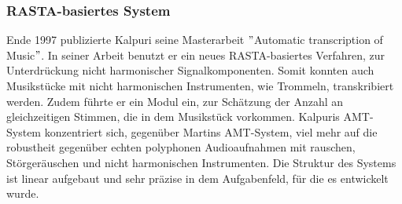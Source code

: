 \subsubsection{RASTA-basiertes System}
Ende 1997 publizierte Kalpuri seine Masterarbeit \("\)Automatic transcription of Music\("\).
\cite{klapuri1998automatic}
In seiner Arbeit benutzt er ein neues RASTA-basiertes Verfahren, zur Unterdrückung nicht harmonischer Signalkomponenten.
Somit konnten auch Musikstücke mit nicht harmonischen Instrumenten, wie Trommeln, transkribiert werden.
Zudem führte er ein Modul ein, zur Schätzung der Anzahl an gleichzeitigen Stimmen, die in dem Musikstück vorkommen.
Kalpuris AMT-System konzentriert sich, gegenüber Martins AMT-System, viel mehr auf die robustheit gegenüber
echten polyphonen Audioaufnahmen mit rauschen, Störgeräuschen und nicht harmonischen Instrumenten.
Die Struktur des Systems ist linear aufgebaut und sehr präzise in dem Aufgabenfeld, für die es entwickelt wurde.

\begin{center}
    \vspace{1em}
    \vspace{1em}
\end{center}

